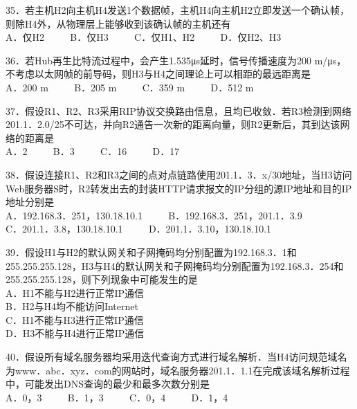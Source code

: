 35．若主机H2向主机H4发送1个数据帧，主机H4向主机H2立即发送一个确认帧，则除H4外，从物理层上能够收到该确认帧的主机还有 \\
A．仅H2 $\qquad$ B．仅H3 $\qquad$ C．仅H1、H2 $\qquad$ D．仅H2、H3

36．若Hub再生比特流过程中，会产生1.535μs延时，信号传播速度为200 m/μs，不考虑以太网帧的前导码，则H3与H4之间理论上可以相距的最远距离是 \\
A．200 m $\qquad$ B．205 m $\qquad$ C．359 m $\qquad$ D．512 m

37．假设R1、R2、R3采用RIP协议交换路由信息，且均已收敛．若R3检测到网络201.1．2.0/25不可达，并向R2通告一次新的距离向量，则R2更新后，其到达该网络的距离是 \\
A．2 $\qquad$ B．3 $\qquad$ C．16 $\qquad$ D．17

38．假设连接R1、R2和R3之间的点对点链路使用201.1．3．x/30地址，当H3访问Web服务器S时，R2转发出去的封装HTTP请求报文的IP分组的源IP地址和目的IP地址分别是 \\
A．192.168.3．251，130.18.10.1 $\qquad$ B．192.168.3．251，201.1．3.9 \\
C．201.1．3.8，130.18.10.1 $\qquad$ D．201.1．3.10，130.18.10.1

39．假设H1与H2的默认网关和子网掩码均分别配置为192.168.3．1和255.255.255.128，H3与H4的默认网关和子网掩码均分别配置为192.168.3．254和255.255.255.128，则下列现象中可能发生的是 \\
A．H1不能与H2进行正常IP通信 \\
B．H2与H4均不能访问Internet \\
C．H1不能与H3进行正常IP通信 \\
D．H3不能与H4进行正常IP通信

40．假设所有域名服务器均采用迭代查询方式进行域名解析．当H4访问规范域名为www．abc．xyz．com的网站时，域名服务器201.1．1.1在完成该域名解析过程中，可能发出DNS查询的最少和最多次数分别是 \\
A．0，3 $\qquad$ B．1，3 $\qquad$ C．0，4 $\qquad$ D．1，4

